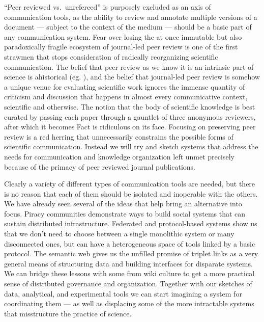 ``Peer reviewed vs.~unrefereed'' is purposely excluded as an axis of
communication tools, as the ability to review and annotate multiple
versions of a document --- subject to the context of the medium ---
should be a basic part of any communication system. Fear over losing the
at once immutable but also paradoxically fragile ecosystem of
journal-led peer review is one of the first strawmen that stops
consideration of radically reorganizing scientific
communication. The belief that peer review as
we know it is an intrinsic part of science is ahistorical (eg. \citep{baldwinScientificAutonomyPublic2018} ), and the belief that
journal-led peer review is somehow a unique venue for evaluating
scientific work ignores the immense quantity of criticism and discussion
that happens in almost every communicative context, scientific and
otherwise. The notion that the body of scientific knowledge is best
curated by passing each paper through a gauntlet of three anonymous
reviewers, after which it becomes Fact is ridiculous on its face.
Focusing on preserving peer review is a red herring that unnecessarily
constrains the possible forms of scientific communication. Instead we
will try and sketch systems that address the needs for communication and
knowledge organization left unmet precisely because of the primacy of
peer reviewed journal publications.

Clearly a variety of different types of communication tools are needed,
but there is no reason that each of them should be isolated and
inoperable with the others. We have already seen several of the ideas
that help bring an alternative into focus. Piracy communities
demonstrate ways to build social systems that can sustain distributed
infrastructure. Federated and protocol-based systems show us that we
don't need to choose between a single monolithic system or many
disconnected ones, but can have a heterogeneous space of tools linked by
a basic protocol. The semantic web gives us the unfilled promise of
triplet links as a very general means of structuring data and building
interfaces for disparate systems. We can bridge these lessons with some
from wiki culture to get a more practical sense of distributed
governance and organization. Together with our sketches of data,
analytical, and experimental tools we can start imagining a system for
coordinating them --- as well as displacing some of the more intractable
systems that misstructure the practice of science.

